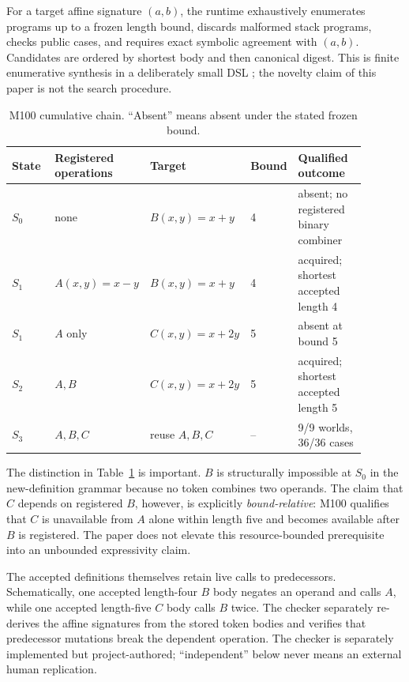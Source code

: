 \documentclass[10pt]{article}
\begin{document}
For a target affine signature $(a,b)$, the runtime exhaustively enumerates programs up to a frozen length bound, discards malformed stack programs, checks public cases, and requires exact symbolic agreement with $(a,b)$. Candidates are ordered by shortest body and then canonical digest. This is finite enumerative synthesis in a deliberately small DSL \cite{gulwani2017synthesis}; the novelty claim of this paper is not the search procedure.

\begin{table}[ht]
\centering
\small
\caption{M100 cumulative chain. ``Absent'' means absent under the stated frozen bound.}
\label{tab:chain}
\begin{tabular}{@{}p{0.14\linewidth}p{0.20\linewidth}p{0.18\linewidth}p{0.13\linewidth}p{0.24\linewidth}@{}}
\toprule
State & Registered operations & Target & Bound & Qualified outcome \\
\midrule
$S_0$ & none & $B(x,y)=x+y$ & 4 & absent; no registered binary combiner \\
$S_1$ & $A(x,y)=x-y$ & $B(x,y)=x+y$ & 4 & acquired; shortest accepted length 4 \\
$S_1$ & $A$ only & $C(x,y)=x+2y$ & 5 & absent at bound 5 \\
$S_2$ & $A,B$ & $C(x,y)=x+2y$ & 5 & acquired; shortest accepted length 5 \\
$S_3$ & $A,B,C$ & reuse $A,B,C$ & -- & 9/9 worlds, 36/36 cases \\
\bottomrule
\end{tabular}
\end{table}

The distinction in Table~\ref{tab:chain} is important. $B$ is structurally impossible at $S_0$ in the new-definition grammar because no token combines two operands. The claim that $C$ depends on registered $B$, however, is explicitly \emph{bound-relative}: M100 qualifies that $C$ is unavailable from $A$ alone within length five and becomes available after $B$ is registered. The paper does not elevate this resource-bounded prerequisite into an unbounded expressivity claim.

The accepted definitions themselves retain live calls to predecessors. Schematically, one accepted length-four $B$ body negates an operand and calls $A$, while one accepted length-five $C$ body calls $B$ twice. The checker separately re-derives the affine signatures from the stored token bodies and verifies that predecessor mutations break the dependent operation. The checker is separately implemented but project-authored; ``independent'' below never means an external human replication.
\end{document}

